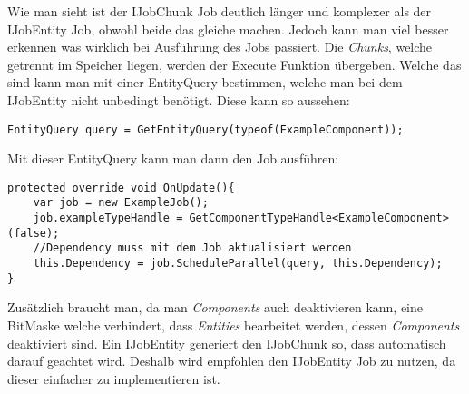 Wie man sieht ist der IJobChunk Job deutlich länger und komplexer als der IJobEntity Job, obwohl beide das gleiche machen. Jedoch kann man viel besser erkennen was wirklich bei Ausführung des Jobs passiert. Die \textit{Chunks}, welche getrennt im Speicher liegen, werden der Execute Funktion übergeben. Welche das sind kann man mit einer EntityQuery bestimmen, welche man bei dem IJobEntity nicht unbedingt benötigt. Diese kann so aussehen:
\begin{lstlisting}[style=code, caption={EntityQuery Beispiel}, label=EntityQuery]
EntityQuery query = GetEntityQuery(typeof(ExampleComponent));
\end{lstlisting}
Mit dieser EntityQuery kann man dann den Job ausführen:
\begin{lstlisting}[style=code, caption={EntityQuery Beispiel}, label=JobExecution]
protected override void OnUpdate(){
    var job = new ExampleJob();
    job.exampleTypeHandle = GetComponentTypeHandle<ExampleComponent>(false);
    //Dependency muss mit dem Job aktualisiert werden	
    this.Dependency = job.ScheduleParallel(query, this.Dependency);
}
\end{lstlisting}
Zusätzlich braucht man, da man \textit{Components} auch deaktivieren kann, eine BitMaske welche verhindert, dass \textit{Entities} bearbeitet werden, dessen \textit{Components} deaktiviert sind. Ein IJobEntity generiert den IJobChunk so, dass automatisch darauf geachtet wird. Deshalb wird empfohlen den IJobEntity Job zu nutzen, da dieser einfacher zu implementieren ist.